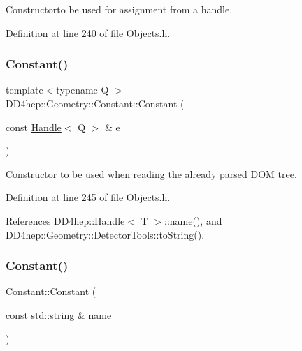 Constructorto be used for assignment from a handle. 



Definition at line 240 of file Objects.\+h.

\hypertarget{class_d_d4hep_1_1_geometry_1_1_constant_a0d9d4b37680918009852bf4be0405cf7}{}\label{class_d_d4hep_1_1_geometry_1_1_constant_a0d9d4b37680918009852bf4be0405cf7} 
\subsubsection{\texorpdfstring{Constant()}{Constant()}\hspace{0.1cm}{\footnotesize\ttfamily [3/5]}}
{\footnotesize\ttfamily template$<$typename Q $>$ \\
D\+D4hep\+::\+Geometry\+::\+Constant\+::\+Constant (\begin{DoxyParamCaption}\item[{const \hyperlink{class_d_d4hep_1_1_handle}{Handle}$<$ Q $>$ \&}]{e }\end{DoxyParamCaption})\hspace{0.3cm}{\ttfamily [inline]}}



Constructor to be used when reading the already parsed D\+OM tree. 



Definition at line 245 of file Objects.\+h.



References D\+D4hep\+::\+Handle$<$ T $>$\+::name(), and D\+D4hep\+::\+Geometry\+::\+Detector\+Tools\+::to\+String().

\hypertarget{class_d_d4hep_1_1_geometry_1_1_constant_acf39c0015ad7cf2450ec1a10231bf18c}{}\label{class_d_d4hep_1_1_geometry_1_1_constant_acf39c0015ad7cf2450ec1a10231bf18c} 
\subsubsection{\texorpdfstring{Constant()}{Constant()}\hspace{0.1cm}{\footnotesize\ttfamily [4/5]}}
{\footnotesize\ttfamily Constant\+::\+Constant (\begin{DoxyParamCaption}\item[{const std\+::string \&}]{name }\end{DoxyParamCaption})}



